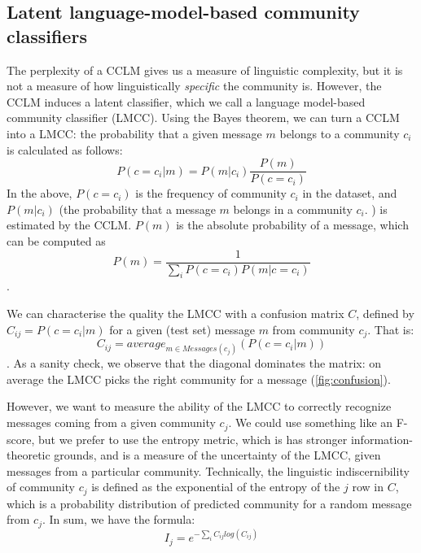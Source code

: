 \documentclass[11pt,a4paper]{article}
\newcommand\bn[1]{\todo[backgroundcolor=green!10]{BN: #1}}
\newcommand\Ind{I}
\begin{document}
\subsection{Latent language-model-based community classifiers}

The perplexity of a CCLM gives us a measure of linguistic complexity,
but it is not a measure of how linguistically \emph{specific} the
community is. However, the CCLM induces a latent classifier,
which we call a language model-based community classifier
(LMCC). Using the Bayes theorem, we can turn a
CCLM into a LMCC: the probability that a given message $m$
belongs to a community $c_i$ is calculated as follows:
\[P(c=c_i | m) = P(m | c_i)\frac {P(m)} {P(c=c_i)}\]
In the above,
$P(c=c_i)$ is the frequency of community $c_i$ in the dataset, and
$P(m | c_i)$ (the probability that a message $m$
belongs in a community $c_i$. ) is estimated by the CCLM. $P(m)$ is the absolute
probability of a message, which can be computed as
\[P(m) = \frac 1 {\sum_i P(c=c_i) P(m|c=c_i ) }\].

We can characterise the quality the LMCC with a confusion matrix
$C$, defined by $C_{ij} = P(c=c_i | m)$ for a given (test set) message $m$ 
from community $c_j$. 
That is: \[C_{ij} = average_{m \in Messages(c_j)}(P(c=c_i | m))\].
As a sanity check, we observe that the diagonal dominates the matrix: on average the LMCC picks the right community for a message (\cref{fig:confusion}).

\begin{figure*}
\caption{LMCC confusion matrices for the best LSTM (left, $c=1$) and transformer (right, $c=3$) models.}
\label{fig:confusion}
\end{figure*}

However, we want to measure the ability of the LMCC to correctly
recognize messages coming from a given community $c_j$. We could use
something like an F-score, but we prefer to use the entropy metric,
which is has stronger information-theoretic grounds, and is a measure
of the uncertainty of the LMCC, given messages from a particular 
community. 
Technically, the linguistic indiscernibility of community $c_j$ is defined 
as the exponential of the entropy of the $j$ row in \(C\),
which is a probability distribution 
of predicted community for a random message from $c_j$.
In sum, we have the formula: \bn{Took out $D$. is it needed elsewhere?}
\[\Ind_j = e^{-\sum_i C_{ij} log(C_{ij})}\]
\end{document}
